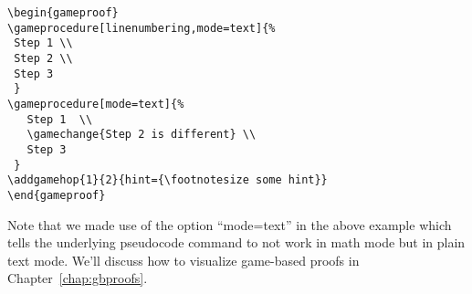 \documentclass[a4paper]{report}
\begin{document}
\vspace{2\baselineskip}
\begin{center}
\begin{gameproof}
\end{gameproof}
\end{center}
\begin{lstlisting}
\begin{gameproof}
\gameprocedure[linenumbering,mode=text]{%
 Step 1 \\
 Step 2 \\
 Step 3  
 }
\gameprocedure[mode=text]{%
   Step 1  \\
   \gamechange{Step 2 is different} \\
   Step 3
 }
\addgamehop{1}{2}{hint={\footnotesize some hint}}
\end{gameproof}
\end{lstlisting}
Note that we made use of the option \enquote{mode=text} in the above example which tells the underlying pseudocode 
command to not work in math mode but in plain text mode. We'll discuss how to visualize game-based proofs in Chapter~\ref{chap:gbproofs}.
\end{document}
